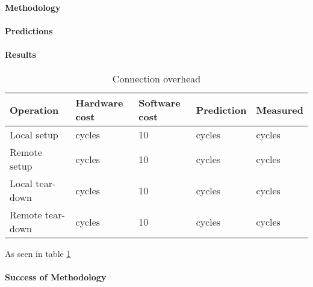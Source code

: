 \paragraph{Methodology}
\paragraph{Predictions}
\paragraph{Results}
\begin{table} [h]
\begin{center}
\begin{tabular}{| l | l | l | l | l |}
\hline
Operation & Hardware cost & Software cost & Prediction & Measured \\
\hline

Local setup 	&  cycles		& 10			&  cycles	&  cycles \\
\hline
Remote setup	&  cycles		& 10			&  cycles	&  cycles \\
\hline
Local tear-down 	&  cycles		& 10			&  cycles	&  cycles \\
\hline
Remote tear-down	&  cycles		& 10			&  cycles	&  cycles \\
\hline


\end{tabular}
\end{center}
\caption{Connection overhead\label{tab:connection-overhead}}
\end{table}

As seen in table \ref{tab:connection-overhead}

\paragraph{Success of Methodology}
